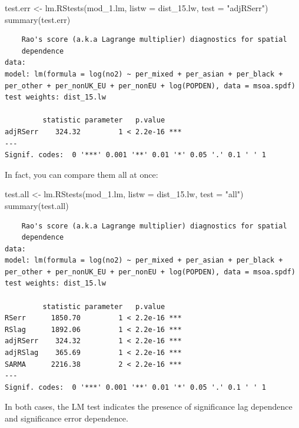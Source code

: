 \documentclass[
  letterpaper,
  DIV=11,
  numbers=noendperiod]{scrreprt}
\newenvironment{Shaded}{\begin{snugshade}}{\end{snugshade}}
\newcommand{\AttributeTok}[1]{\textcolor[rgb]{0.40,0.45,0.13}{#1}}
\newcommand{\FunctionTok}[1]{\textcolor[rgb]{0.28,0.35,0.67}{#1}}
\newcommand{\NormalTok}[1]{\textcolor[rgb]{0.00,0.23,0.31}{#1}}
\newcommand{\OtherTok}[1]{\textcolor[rgb]{0.00,0.23,0.31}{#1}}
\newcommand{\StringTok}[1]{\textcolor[rgb]{0.13,0.47,0.30}{#1}}
\begin{document}
\begin{Shaded}
\begin{Highlighting}[]
\NormalTok{test.err }\OtherTok{\textless{}{-}} \FunctionTok{lm.RStests}\NormalTok{(mod\_1.lm, }
                       \AttributeTok{listw =}\NormalTok{ dist\_15.lw, }
                       \AttributeTok{test =} \StringTok{"adjRSerr"}\NormalTok{)}
\FunctionTok{summary}\NormalTok{(test.err)}
\end{Highlighting}
\end{Shaded}

\begin{verbatim}
    Rao's score (a.k.a Lagrange multiplier) diagnostics for spatial
    dependence
data:  
model: lm(formula = log(no2) ~ per_mixed + per_asian + per_black +
per_other + per_nonUK_EU + per_nonEU + log(POPDEN), data = msoa.spdf)
test weights: dist_15.lw
 
         statistic parameter   p.value    
adjRSerr    324.32         1 < 2.2e-16 ***
---
Signif. codes:  0 '***' 0.001 '**' 0.01 '*' 0.05 '.' 0.1 ' ' 1
\end{verbatim}

In fact, you can compare them all at once:

\begin{Shaded}
\begin{Highlighting}[]
\NormalTok{test.all }\OtherTok{\textless{}{-}} \FunctionTok{lm.RStests}\NormalTok{(mod\_1.lm, }
                       \AttributeTok{listw =}\NormalTok{ dist\_15.lw, }
                       \AttributeTok{test =} \StringTok{"all"}\NormalTok{)}
\FunctionTok{summary}\NormalTok{(test.all)}
\end{Highlighting}
\end{Shaded}

\begin{verbatim}
    Rao's score (a.k.a Lagrange multiplier) diagnostics for spatial
    dependence
data:  
model: lm(formula = log(no2) ~ per_mixed + per_asian + per_black +
per_other + per_nonUK_EU + per_nonEU + log(POPDEN), data = msoa.spdf)
test weights: dist_15.lw
 
         statistic parameter   p.value    
RSerr      1850.70         1 < 2.2e-16 ***
RSlag      1892.06         1 < 2.2e-16 ***
adjRSerr    324.32         1 < 2.2e-16 ***
adjRSlag    365.69         1 < 2.2e-16 ***
SARMA      2216.38         2 < 2.2e-16 ***
---
Signif. codes:  0 '***' 0.001 '**' 0.01 '*' 0.05 '.' 0.1 ' ' 1
\end{verbatim}

In both cases, the LM test indicates the presence of significance lag
dependence and significance error dependence.
\end{document}
